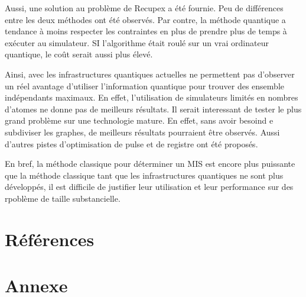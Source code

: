 \documentclass[11pt]{article}
\begin{document}
Aussi, une solution au problème de Recupex a été fournie. Peu de différences entre les deux méthodes ont été observés. Par contre, la méthode quantique a tendance à moins respecter les contraintes en plus de prendre plus de temps à exécuter au simulateur. SI l'algorithme était roulé sur un vrai ordinateur quantique, le coût serait aussi plus élevé.

Ainsi, avec les infrastructures quantiques actuelles ne permettent pas d'observer un réel avantage d'utiliser l'information quantique pour trouver des ensemble indépendants maximaux. En effet, l'utilisation de simulateurs limités en nombres d'atomes ne donne pas de meilleurs résultats. Il serait interessant de tester le plus grand problème sur une technologie mature. En effet, sans avoir besoind e subdiviser les graphes, de meilleurs résultats pourraient être observés. Aussi d'autres pistes d'optimisation de pulse et de registre ont été proposés.

En bref, la méthode classique pour déterminer un MIS est encore plus puissante que la méthode classique tant que les infrastructures quantiques ne sont plus développés, il est difficile de justifier leur utilisation et leur performance sur des rpoblème de taille substancielle.

\section{Références}
\printbibliography[heading=none]

\section{Annexe}
\end{document}
